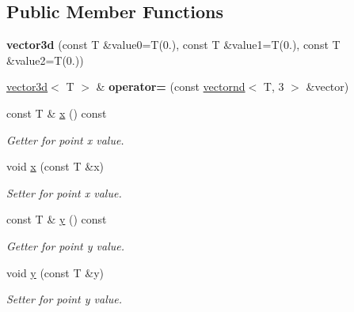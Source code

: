 \subsection*{Public Member Functions}
\begin{DoxyCompactItemize}
\item 
\mbox{\label{classacme_1_1vector3d_a93f7fa7c6419cccf56333d909cc1d51e}} 
{\bfseries vector3d} (const T \&value0=T(0.), const T \&value1=T(0.), const T \&value2=T(0.))
\item 
\mbox{\label{classacme_1_1vector3d_a2668398e02c44822585f3bef70ab3645}} 
\hyperlink{classacme_1_1vector3d}{vector3d}$<$ T $>$ \& {\bfseries operator=} (const \hyperlink{classacme_1_1vectornd}{vectornd}$<$ T, 3 $>$ \&vector)
\item 
\mbox{\label{classacme_1_1point3d_a7ace84b8e85e0762e8c900ef7dfabf61}} 
const T \& \hyperlink{classacme_1_1point3d_a7ace84b8e85e0762e8c900ef7dfabf61}{x} () const
\begin{DoxyCompactList}\small\item\em Getter for point x value. \end{DoxyCompactList}\item 
void \hyperlink{classacme_1_1point3d_acccc28f082747904be0f39bd5972a40e}{x} (const T \&x)
\begin{DoxyCompactList}\small\item\em Setter for point x value. \end{DoxyCompactList}\item 
\mbox{\label{classacme_1_1point3d_a1a13aea2bb5e756c74ca6187e4b927d2}} 
const T \& \hyperlink{classacme_1_1point3d_a1a13aea2bb5e756c74ca6187e4b927d2}{y} () const
\begin{DoxyCompactList}\small\item\em Getter for point y value. \end{DoxyCompactList}\item 
void \hyperlink{classacme_1_1point3d_ad9b058b4ba5ca4172a8c4ded27c89825}{y} (const T \&y)
\begin{DoxyCompactList}\small\item\em Setter for point y value. \end{DoxyCompactList}\item 
\mbox{\label{classacme_1_1point3d_acbea0b411604f8da4f690e09e2401743}} 

\end{DoxyCompactItemize}
